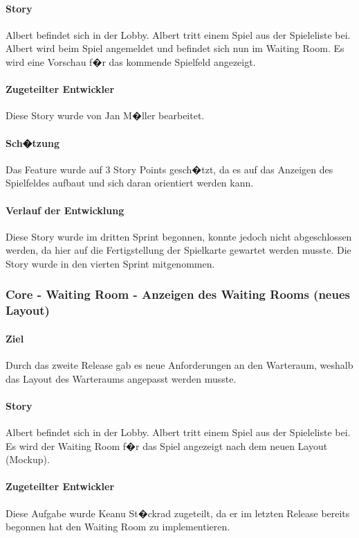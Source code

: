 \documentclass[12pt, titlepage]{scrartcl}
\begin{document}
		\paragraph{Story} Albert befindet sich in der Lobby. Albert tritt einem Spiel aus der Spieleliste bei. Albert wird beim Spiel angemeldet und befindet sich nun im Waiting Room. Es wird eine Vorschau f�r das kommende Spielfeld angezeigt.
		\paragraph{Zugeteilter Entwickler} Diese Story wurde von Jan M�ller bearbeitet.
		\paragraph{Sch�tzung}
		Das Feature wurde auf 3 Story Points gesch�tzt, da es auf das Anzeigen des Spielfeldes aufbaut und sich daran orientiert werden kann.
		\paragraph{Verlauf der Entwicklung} 
		Diese Story wurde im dritten Sprint begonnen, konnte jedoch nicht abgeschlossen werden, da hier auf die Fertigstellung der Spielkarte gewartet werden musste. Die Story wurde in den vierten Sprint mitgenommen.
		
		\subsubsection{Core - Waiting Room - Anzeigen des Waiting Rooms (neues Layout)}
		\paragraph{Ziel} Durch das zweite Release gab es neue Anforderungen an den Warteraum, weshalb das Layout des Warteraums angepasst werden musste.
		\paragraph{Story} Albert befindet sich in der Lobby. Albert tritt einem Spiel aus der Spieleliste bei. Es wird der Waiting Room f�r das Spiel angezeigt nach dem neuen Layout (Mockup).
		\paragraph{Zugeteilter Entwickler} Diese Aufgabe wurde Keanu St�ckrad zugeteilt, da er im letzten Release bereits begonnen hat den Waiting Room zu implementieren.
\end{document}
